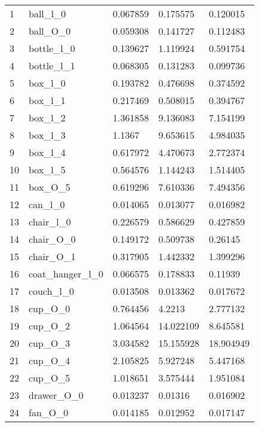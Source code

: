 \begin{longtable}{ @{\zz\extracolsep{\fill}} l|llll}
\endhead
%
1  & ball\_l\_0               & 0.067859 & 0.175575  & 0.120015  \\
2  & ball\_O\_0               & 0.059308 & 0.141727  & 0.112483  \\
3  & bottle\_l\_0             & 0.139627 & 1.119924  & 0.591754  \\
4  & bottle\_l\_1             & 0.068305 & 0.131283  & 0.099736  \\
5  & box\_l\_0                & 0.193782 & 0.476698  & 0.374592  \\
6  & box\_l\_1                & 0.217469 & 0.508015  & 0.394767  \\
7  & box\_l\_2                & 1.361858 & 9.136083  & 7.154199  \\
8  & box\_l\_3                & 1.1367   & 9.653615  & 4.984035  \\
9  & box\_l\_4                & 0.617972 & 4.470673  & 2.772374  \\
10 & box\_l\_5                & 0.564576 & 1.144243  & 1.514405  \\
11 & box\_O\_5                & 0.619296 & 7.610336  & 7.494356  \\
12 & can\_l\_0                & 0.014065 & 0.013077  & 0.016982  \\
13 & chair\_l\_0              & 0.226579 & 0.586629  & 0.427859  \\
14 & chair\_O\_0              & 0.149172 & 0.509738  & 0.26145   \\
15 & chair\_O\_1              & 0.317905 & 1.442332  & 1.399296  \\
16 & coat\_hanger\_l\_0       & 0.066575 & 0.178833  & 0.11939   \\
17 & couch\_l\_0              & 0.013508 & 0.013362  & 0.017672  \\
18 & cup\_O\_0                & 0.764456 & 4.2213    & 2.777132  \\
19 & cup\_O\_2                & 1.064564 & 14.022109 & 8.645581  \\
20 & cup\_O\_3                & 3.034582 & 15.155928 & 18.904949 \\
21 & cup\_O\_4                & 2.105825 & 5.927248  & 5.447168  \\
22 & cup\_O\_5                & 1.018651 & 3.575444  & 1.951084  \\
23 & drawer\_O\_0             & 0.013237 & 0.01316   & 0.016902  \\
24 & fan\_O\_0                & 0.014185 & 0.012952  & 0.017147  \\

\end{longtable}
